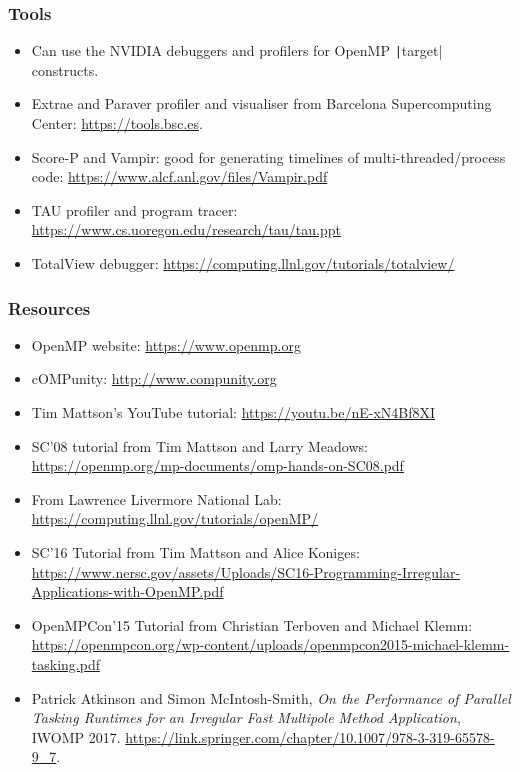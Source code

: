 \documentclass{beamer}
\begin{document}
\begin{frame}
\frametitle{Tools}
\begin{itemize}
  \item Can use the NVIDIA debuggers and profilers for OpenMP \texttt|target| constructs.
  \item Extrae and Paraver profiler and visualiser from Barcelona Supercomputing Center: \url{https://tools.bsc.es}.
  \item Score-P and Vampir: good for generating timelines of multi-threaded/process code: \url{https://www.alcf.anl.gov/files/Vampir.pdf}
  \item TAU profiler and program tracer: \url{https://www.cs.uoregon.edu/research/tau/tau.ppt}
  \item TotalView debugger: \url{https://computing.llnl.gov/tutorials/totalview/}
\end{itemize}
\end{frame}

\begin{frame}
\frametitle{Resources}
\begin{itemize}
  \item OpenMP website: \url{https://www.openmp.org}
  \item cOMPunity: \url{http://www.compunity.org}
  \item Tim Mattson's YouTube tutorial: \url{https://youtu.be/nE-xN4Bf8XI}
  \item SC'08 tutorial from Tim Mattson and Larry Meadows: \url{https://openmp.org/mp-documents/omp-hands-on-SC08.pdf}
  \item From Lawrence Livermore National Lab: \url{https://computing.llnl.gov/tutorials/openMP/}
  \item SC'16 Tutorial from Tim Mattson and Alice Koniges: \url{https://www.nersc.gov/assets/Uploads/SC16-Programming-Irregular-Applications-with-OpenMP.pdf}
  \item OpenMPCon'15 Tutorial from Christian Terboven and Michael Klemm: \url{https://openmpcon.org/wp-content/uploads/openmpcon2015-michael-klemm-tasking.pdf}
  \item Patrick Atkinson and Simon McIntosh-Smith, \emph{On the Performance of Parallel Tasking Runtimes for an Irregular Fast Multipole Method Application}, IWOMP 2017. \url{https://link.springer.com/chapter/10.1007/978-3-319-65578-9_7}.
\end{itemize}
\end{frame}
\end{document}
